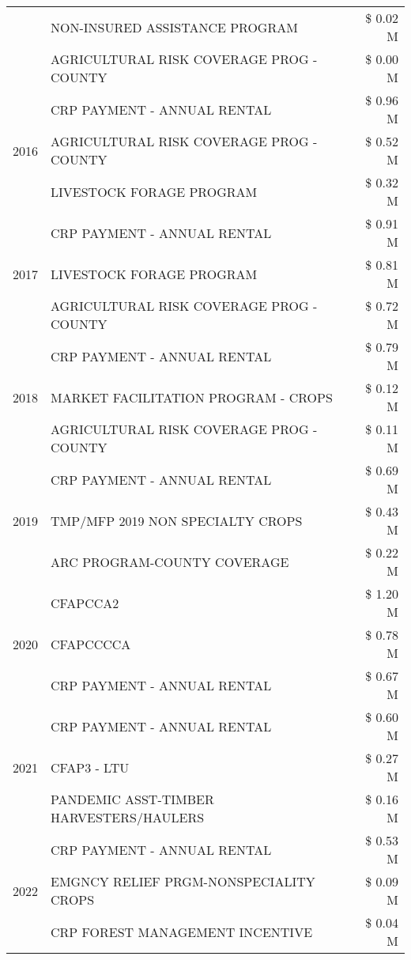 \begin{tabular}{llr}
 & NON-INSURED ASSISTANCE PROGRAM & \$ 0.02 M \\
 & AGRICULTURAL RISK COVERAGE PROG - COUNTY & \$ 0.00 M \\
\cline{1-3}
\multirow[t]{3}{*}{2016} & CRP PAYMENT - ANNUAL RENTAL & \$ 0.96 M \\
 & AGRICULTURAL RISK COVERAGE PROG - COUNTY & \$ 0.52 M \\
 & LIVESTOCK FORAGE PROGRAM & \$ 0.32 M \\
\cline{1-3}
\multirow[t]{3}{*}{2017} & CRP PAYMENT - ANNUAL RENTAL & \$ 0.91 M \\
 & LIVESTOCK FORAGE PROGRAM & \$ 0.81 M \\
 & AGRICULTURAL RISK COVERAGE PROG - COUNTY & \$ 0.72 M \\
\cline{1-3}
\multirow[t]{3}{*}{2018} & CRP PAYMENT - ANNUAL RENTAL & \$ 0.79 M \\
 & MARKET FACILITATION PROGRAM - CROPS & \$ 0.12 M \\
 & AGRICULTURAL RISK COVERAGE PROG - COUNTY & \$ 0.11 M \\
\cline{1-3}
\multirow[t]{3}{*}{2019} & CRP PAYMENT - ANNUAL RENTAL & \$ 0.69 M \\
 & TMP/MFP 2019 NON SPECIALTY CROPS & \$ 0.43 M \\
 & ARC PROGRAM-COUNTY COVERAGE & \$ 0.22 M \\
\cline{1-3}
\multirow[t]{3}{*}{2020} & CFAPCCA2 & \$ 1.20 M \\
 & CFAPCCCCA & \$ 0.78 M \\
 & CRP PAYMENT - ANNUAL RENTAL & \$ 0.67 M \\
\cline{1-3}
\multirow[t]{3}{*}{2021} & CRP PAYMENT - ANNUAL RENTAL & \$ 0.60 M \\
 & CFAP3 - LTU & \$ 0.27 M \\
 & PANDEMIC ASST-TIMBER HARVESTERS/HAULERS & \$ 0.16 M \\
\cline{1-3}
\multirow[t]{3}{*}{2022} & CRP PAYMENT - ANNUAL RENTAL & \$ 0.53 M \\
 & EMGNCY RELIEF PRGM-NONSPECIALITY CROPS & \$ 0.09 M \\
 & CRP FOREST MANAGEMENT INCENTIVE & \$ 0.04 M \\
\cline{1-3}
\bottomrule
\end{tabular}
